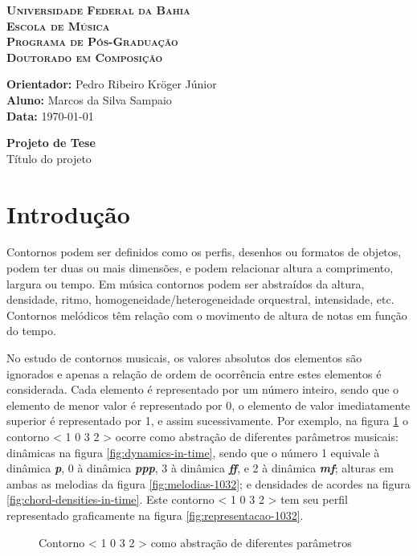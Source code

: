 \documentclass[12pt]{article}
\newcommand{\cabecalho}[0]{
  \textbf{\textsc{Universidade Federal da Bahia}} \\
  \textbf{\textsc{Escola de Música}} \\
  \textbf{\textsc{Programa de Pós-Graduação}} \\
  \textbf{\textsc{Doutorado em Composição}} \par
  \vspace*{1ex}
  \textbf{Orientador:} Pedro Ribeiro Kröger Júnior\\
  \textbf{Aluno: } Marcos da Silva Sampaio \\
  \textbf{Data: } \today
  \thispagestyle{empty}
}
\newcommand{\titulo}[1]{
  \vspace{1cm}
  \begin{center}{
      \Huge \textbf{Projeto de Tese} \\
    }
    \vspace{12pt}
    {\Large #1}
  \end{center}
  \vspace{1cm}
}
\begin{document}
\cabecalho
\titulo{Título do projeto}


\section{Introdução}
\label{sec:introducao}



Contornos podem ser definidos como os perfis, desenhos ou formatos de
objetos, podem ter duas ou mais dimensões, e podem relacionar altura a
comprimento, largura ou tempo. Em música contornos podem ser
abstraídos da altura, densidade, ritmo, homogeneidade/heterogeneidade
orquestral, intensidade, etc. Contornos melódicos têm relação com o
movimento de altura de notas em função do tempo.

No estudo de contornos musicais, os valores absolutos dos elementos
são ignorados e apenas a relação de ordem de ocorrência entre estes
elementos é considerada. Cada elemento é representado por um número
inteiro, sendo que o elemento de menor valor é representado por 0, o
elemento de valor imediatamente superior é representado por 1, e assim
sucessivamente. Por exemplo, na figura \ref{fig:representacoes} o
contorno < 1 0 3 2 > ocorre como abstração de diferentes parâmetros
musicais: dinâmicas na figura \ref{fig:dynamics-in-time}, sendo que o
número 1 equivale à dinâmica \textbf{\textit{p}}, 0 à dinâmica
\textbf{\textit{ppp}}, 3 à dinâmica \textbf{\textit{ff}}, e 2 à
dinâmica \textbf{\textit{mf}}; alturas em ambas as melodias da figura
\ref{fig:melodias-1032}; e densidades de acordes na figura
\ref{fig:chord-densities-in-time}. Este contorno < 1 0 3 2 > tem seu
perfil representado graficamente na figura
\ref{fig:representacao-1032}.

\begin{figure}[h]
  \centering
  \quad

  \subfloat[Altura]{
    \texttt{[image: ly-1032]}
    \label{fig:melodias-1032}
  }
  \caption{Contorno < 1 0 3 2 > como abstração de diferentes
    parâmetros}
  \label{fig:representacoes}
\end{figure}
\end{document}
